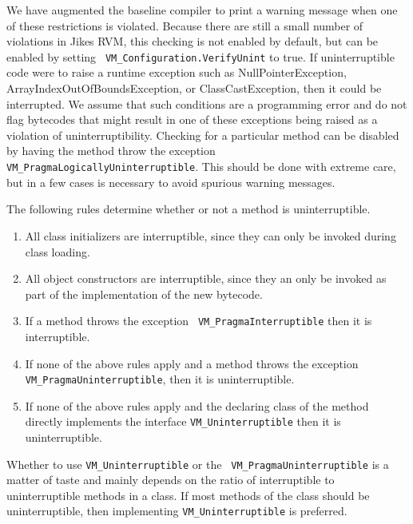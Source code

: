 We have augmented the baseline compiler to print a warning message
when one of these restrictions is violated.  Because there are still a
small number of violations in Jikes RVM, this checking is not enabled
by default, but can be enabled by setting {\tt
VM\_Configuration.VerifyUnint} to  true. 
If uninterruptible code were to raise a runtime exception such
as NullPointerException, ArrayIndexOutOfBoundsException, or
ClassCastException, then it could be interrupted.  We assume that such
conditions are a programming error and do not flag bytecodes that
might result in one of these exceptions being raised as a violation of
uninterruptibility. Checking for a particular method can be disabled
by having the method throw the exception {\tt
VM\_PragmaLogicallyUninterruptible}. This should be done with extreme
care, but in a few cases is necessary to avoid spurious warning
messages. 

The following rules determine whether or not a method is
uninterruptible.
\begin{enumerate}
\item{} All class initializers are interruptible, since they
can only be invoked during class loading.
\item{} All object constructors are interruptible, since they an
only be invoked as part of the implementation of the new bytecode.
\item{} If a method throws the exception {\tt
VM\_PragmaInterruptible} then it is interruptible.
\item{} If none of the above rules apply and a method throws the
exception {\tt VM\_PragmaUninterruptible}, then it is uninterruptible.
\item{} If none of the above rules apply and the declaring class of
the method directly implements the interface {\tt VM\_Uninterruptible}
then it is uninterruptible.
\end{enumerate}
Whether to use {\tt VM\_Uninterruptible} or the {\tt
VM\_PragmaUninterruptible} is a matter of taste and mainly depends on
the ratio of interruptible to uninterruptible methods in a class.  If
most methods of the class should be uninterruptible, then implementing
{\tt VM\_Uninterruptible} is preferred. 

\JavaTMFooter
